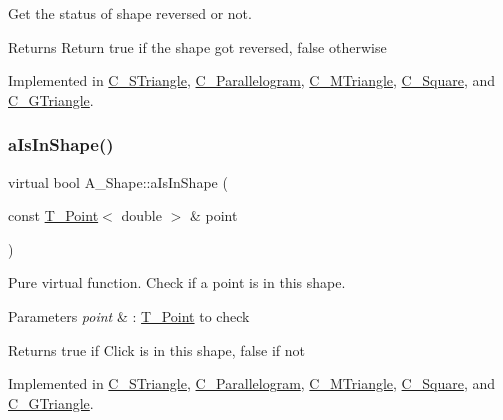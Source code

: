 Get the status of shape reversed or not. 

\begin{DoxyReturn}{Returns}
Return true if the shape got reversed, false otherwise 
\end{DoxyReturn}


Implemented in \hyperlink{classC__STriangle_a707d24ede0b9db731dbefee9ab5c017b}{C\+\_\+\+S\+Triangle}, \hyperlink{classC__Parallelogram_a14b00a011ff4fe3170c5ab11af628252}{C\+\_\+\+Parallelogram}, \hyperlink{classC__MTriangle_a5c0488c23e9e64750bb879d0394830b2}{C\+\_\+\+M\+Triangle}, \hyperlink{classC__Square_afe17127df3b112178973ad2182fe9204}{C\+\_\+\+Square}, and \hyperlink{classC__GTriangle_a8aa6444f3d7f001f61cd3903a46f4b67}{C\+\_\+\+G\+Triangle}.

\mbox{\label{classA__Shape_a63f825cbc9780208d9a137f5c14917d0}} 
\subsubsection{\texorpdfstring{a\+Is\+In\+Shape()}{aIsInShape()}}
{\footnotesize\ttfamily virtual bool A\+\_\+\+Shape\+::a\+Is\+In\+Shape (\begin{DoxyParamCaption}\item[{const \hyperlink{classT__Point}{T\+\_\+\+Point}$<$ double $>$ \&}]{point }\end{DoxyParamCaption})\hspace{0.3cm}{\ttfamily [pure virtual]}}



Pure virtual function. Check if a point is in this shape. 


\begin{DoxyParams}{Parameters}
{\em point} & \+: \hyperlink{classT__Point}{T\+\_\+\+Point} to check \\
\hline
\end{DoxyParams}
\begin{DoxyReturn}{Returns}
true if Click is in this shape, false if not 
\end{DoxyReturn}


Implemented in \hyperlink{classC__STriangle_a3bc82d7ea53a6a058b9fb49bbd89282c}{C\+\_\+\+S\+Triangle}, \hyperlink{classC__Parallelogram_a9ccee396c30606bfe64df416c22586d5}{C\+\_\+\+Parallelogram}, \hyperlink{classC__MTriangle_ae29e4f6608a0079507c6397b3dbef246}{C\+\_\+\+M\+Triangle}, \hyperlink{classC__Square_ac5ffad4afca051f117b43012fb4dc239}{C\+\_\+\+Square}, and \hyperlink{classC__GTriangle_a417b28c74dd35f81a19b5bd1d214ba8d}{C\+\_\+\+G\+Triangle}.

